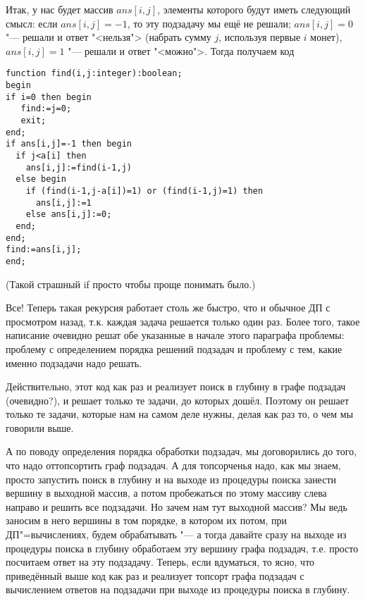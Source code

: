 Итак, у нас будет массив $ans[i,j]$, элементы которого будут иметь следующий смысл: если $ans[i,j]=-1$, то эту подзадачу мы ещё не решали; $ans[i,j]=0$ "--- решали и ответ "<нельзя"> (набрать сумму $j$, используя первые $i$ монет), $ans[i,j]=1$ "--- решали и ответ "<можно">. Тогда получаем код

\begin{codesampleo}\begin{verbatim}
function find(i,j:integer):boolean;
begin
if i=0 then begin
   find:=j=0;
   exit;
end;
if ans[i,j]=-1 then begin
  if j<a[i] then
    ans[i,j]:=find(i-1,j)
  else begin
    if (find(i-1,j-a[i])=1) or (find(i-1,j)=1) then
      ans[i,j]:=1
    else ans[i,j]:=0;
  end;
end;
find:=ans[i,j];
end;
\end{verbatim}
\end{codesampleo}
(Такой страшный if просто чтобы проще понимать было.)

Все! Теперь такая рекурсия работает столь же быстро, что и обычное ДП с просмотром назад, т.к. каждая задача решается только один раз. Более того, такое написание очевидно решат обе указанные в начале этого параграфа проблемы: проблему с определением порядка решений подзадач и проблему с тем, какие именно подзадачи надо решать.

Действительно, этот код как раз и реализует поиск в глубину в графе подзадач (очевидно?), и решает только те задачи, до которых дошёл. Поэтому он решает только те задачи, которые нам на самом деле нужны, делая как раз то, о чем мы говорили выше.

А по поводу определения порядка обработки подзадач, мы договорились до того, что надо оттопсортить граф подзадач. А для топсорченья надо, как мы знаем, просто запустить поиск в глубину и на выходе из процедуры поиска занести вершину в выходной массив, а потом пробежаться по этому массиву слева направо и решить все подзадачи. Но зачем нам тут выходной массив? Мы ведь заносим в него вершины в том порядке, в котором их потом, при ДП"=вычислениях, будем обрабатывать "--- а тогда давайте сразу на выходе из процедуры поиска в глубину обработаем эту вершину графа подзадач, т.е. просто посчитаем ответ на эту подзадачу. Теперь, если вдуматься, то ясно, что приведённый выше код как раз и реализует топсорт графа подзадач с вычислением ответов на подзадачи при выходе из процедуры поиска в глубину.

